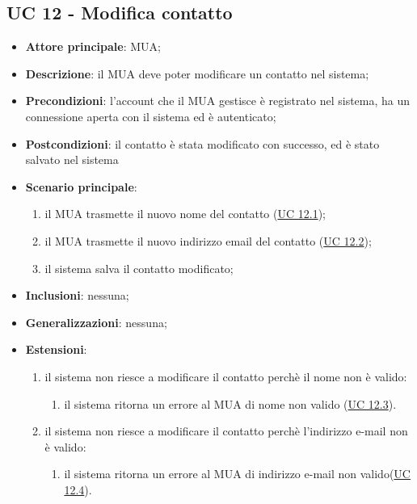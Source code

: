 \subsection{UC 12 - Modifica contatto} \label{sec:UC12}
    \begin{itemize}
        \item \textbf{Attore principale}: MUA;
        \item \textbf{Descrizione}: il MUA deve poter modificare un contatto nel sistema;
        \item \textbf{Precondizioni}: l’account che il MUA gestisce è registrato nel sistema, ha un connessione aperta con il sistema ed è autenticato;
        \item \textbf{Postcondizioni}: il contatto è stata modificato con successo, ed è stato salvato nel sistema
        \item \textbf{Scenario principale}:
            \begin{enumerate}
                \item il MUA trasmette il nuovo nome del contatto (\hyperref[sec:UC12.1]{UC 12.1});
                \item il MUA trasmette il nuovo indirizzo email del contatto (\hyperref[sec:UC12.2]{UC 12.2});
                \item il sistema salva il contatto modificato;
            \end{enumerate}
        \item \textbf{Inclusioni}: nessuna;
        \item \textbf{Generalizzazioni}: nessuna;
        \item \textbf{Estensioni}: 
        \begin{enumerate}[label=\alph*.]
            \item il sistema non riesce a modificare il contatto perchè il nome non è valido:
            \begin{enumerate}[label=\arabic*.]
                \item il sistema ritorna un errore al MUA di nome non valido (\hyperref[sec:UC12.3]{UC 12.3}).
            \end{enumerate}
            \item il sistema non riesce a modificare il contatto perchè l'indirizzo e-mail non è valido:
            \begin{enumerate}[label=\arabic*.]
                \item il sistema ritorna un errore al MUA di indirizzo e-mail non valido(\hyperref[sec:UC12.4]{UC 12.4}).
            \end{enumerate}
        \end{enumerate}
    \end{itemize}

